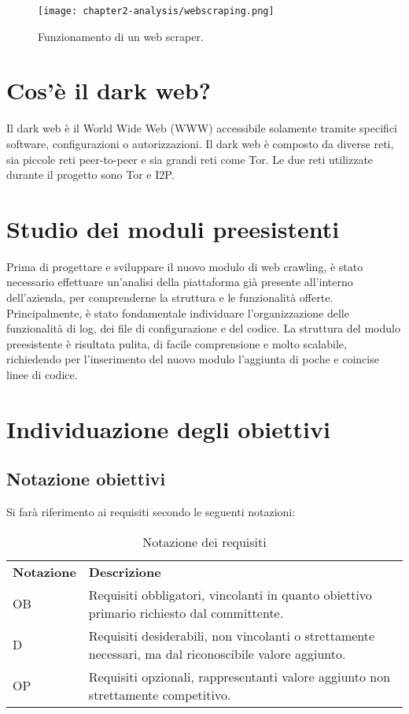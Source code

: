 \begin{figure}[!h] 
    \centering 
    \texttt{[image: chapter2-analysis/webscraping.png]} 
    \caption{Funzionamento di un web scraper.}
\end{figure}

\section{Cos'è il dark web?}
Il dark web è il World Wide Web (WWW) accessibile solamente tramite specifici software, configurazioni o autorizzazioni. Il dark web è composto da diverse reti, sia piccole reti peer-to-peer e sia grandi reti come \gls{Tor}. Le due reti utilizzate durante il progetto sono \gls{Tor} e \gls{I2P}.
\section{Studio dei moduli preesistenti}

Prima di progettare e sviluppare il nuovo modulo di web crawling, è stato necessario effettuare un’analisi della piattaforma già presente all'interno dell'azienda, per comprenderne la struttura e le funzionalità offerte. Principalmente, è stato fondamentale individuare l'organizzazione delle funzionalità di log, dei file di configurazione e del codice. La struttura del modulo preesistente è risultata pulita, di facile comprensione e molto scalabile, richiedendo per l'inserimento del nuovo modulo l'aggiunta di poche e coincise linee di codice.

\section{Individuazione degli obiettivi}

\subsection{Notazione obiettivi}
Si farà riferimento ai requisiti secondo le seguenti notazioni:
\begin{longtable}{|p{}|p{}|}
	\caption{Notazione dei requisiti}
	\label{tab:notazione-requisiti} \\
	\hline
    \textbf{Notazione}	&	\textbf{Descrizione} \\
    OB			&	Requisiti obbligatori, vincolanti in quanto obiettivo primario richiesto dal committente. \\  
	\hline
    D			&	Requisiti desiderabili, non vincolanti o strettamente necessari, ma dal riconoscibile valore aggiunto. \\ 
	\hline
    OP			&	Requisiti opzionali, rappresentanti valore aggiunto non strettamente competitivo. \\
    \hline
\end{longtable}%

